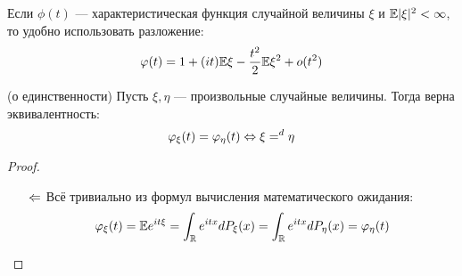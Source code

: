 \begin{corollary}
	Если $\phi(t)$ --- характеристическая функция случайной величины $\xi$ и $\mathbb{E}|\xi|^2 < \infty$, то удобно использовать разложение:
	\[
		\varphi(t) = 1 + (it)\mathbb{E}\xi - \frac{t^2}{2}\mathbb{E}\xi^2 + o(t^2)
	\]
\end{corollary}

\begin{theorem} (о единственности)
	Пусть $\xi, \eta$ --- произвольные случайные величины. Тогда верна эквивалентность:
	\[
		\varphi_\xi(t) = \varphi_\eta(t) \Leftrightarrow \xi =^d \eta
	\]
\end{theorem}

\begin{proof}~
	\begin{itemize}
		\item[$\Leftarrow$] Всё тривиально из формул вычисления математического ожидания:
		\[
			\varphi_\xi(t) = \mathbb{E} e^{it\xi} = \int_{\mathbb{R}} e^{itx}dP_\xi(x) = \int_{\mathbb{R}} e^{itx}dP_\eta(x) = \varphi_\eta(t)
		\]
		

\end{itemize}
\end{proof}
